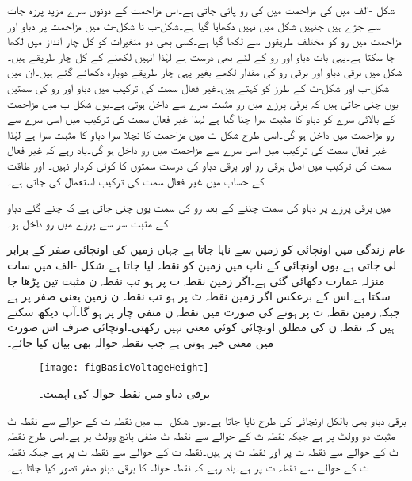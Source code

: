 شکل -الف میں  کی مزاحمت میں  کی رو پائی جاتی ہے۔اس مزاحمت کے دونوں سرے مزید پرزہ جات سے جڑے ہیں جنہیں شکل میں نہیں دکھایا گیا ہے۔شکل-ب تا شکل-ٹ میں مزاحمت پر دباو اور مزاحمت میں رو کو مختلف طریقوں سے لکھا گیا ہے۔کسی بھی دو متغیرات کو کل چار انداز میں لکھا جا سکتا ہے۔یہی بات دباو اور رو کے لئے بھی درست ہے لہٰذا انہیں لکھنے کے کل چار طریقے ہیں۔شکل  میں برقی دباو اور برقی رو کی مقدار لکھے بغیر یہی چار طریقے دوبارہ دکھائے گئے ہیں۔ان میں شکل-ب اور شکل-ٹ کے طرز کو  کہتے ہیں۔غیر فعال سمت کی ترکیب میں دباو  اور رو  کی سمتیں یوں چنی جاتی ہیں کہ برقی پرزے میں رو مثبت سرے سے داخل ہوتی ہے۔یوں شکل-ب میں مزاحمت کے بالائی سرے کو دباو کا مثبت سرا چنا گیا ہے لہٰذا غیر فعال سمت کی ترکیب میں اسی سرے سے رو مزاحمت میں داخل ہو گی۔اسی طرح شکل-ٹ میں مزاحمت کا نچلا سرا دباو کا مثبت سرا ہے لہٰذا غیر فعال سمت کی ترکیب میں اسی سرے سے مزاحمت میں رو داخل ہو گی۔یاد رہے کہ غیر فعال سمت کی ترکیب میں اصل برقی رو اور برقی دباو کی درست سمتوں کا کوئی کردار نہیں۔ اور طاقت کے حساب میں غیر فعال سمت کی ترکیب استعمال کی جاتی ہے۔

 میں برقی پرزے پر دباو کی سمت چننے کے بعد رو کی سمت یوں چنی جاتی ہے کہ چنے گئے دباو کے مثبت سر سے پرزے میں  رو داخل ہو۔

عام زندگی میں اونچائی کو زمین سے ناپا جاتا ہے جہاں زمین کی اونچائی صفر کے برابر لی جاتی ہے۔یوں اونچائی کے ناپ میں زمین کو نقطہ  لیا جاتا ہے۔شکل -الف میں سات منزلہ عمارت دکھائی گئی ہے۔اگر زمین نقطہ ت پر ہو تب نقطہ ن مثبت تین پڑھا جا سکتا ہے۔اس کے برعکس اگر زمین نقطہ ٹ پر ہو تب نقطہ ن زمین یعنی صفر پر ہے جبکہ زمین نقطہ ث پر ہونے کی صورت میں نقطہ ن منفی چار پر ہو گا۔آپ دیکھ سکتے ہیں کہ نقطہ ن کی مطلق اونچائی کوئی معنی نہیں رکھتی۔اونچائی صرف اس صورت میں معنی خیز ہوتی ہے جب نقطہ حوالہ بھی بیان کیا جائے۔
\begin{figure}
\centering
\texttt{[image: figBasicVoltageHeight]}
\caption{برقی دباو میں نقطہ حوالہ کی اہمیت۔}
\label{شکل_بنیادی_دباو_اور_اونچائی}
\end{figure}

برقی دباو بھی بالکل اونچائی کی طرح ناپا جاتا ہے۔یوں شکل -ب میں نقطہ ت کے حوالے سے نقطہ ٹ مثبت دو وولٹ  پر ہے جبکہ نقطہ ث کے حوالے سے نقطہ ٹ منفی پانچ وولٹ  پر ہے۔اسی طرح نقطہ ٹ کے حوالے سے نقطہ ت  پر اور نقطہ ث  پر ہیں۔نقطہ ت کے حوالے سے نقطہ ث  پر ہے جبکہ نقطہ ث کے حوالے سے نقطہ ت  پر ہے۔یاد رہے کہ نقطہ حوالہ کا برقی دباو صفر تصور کیا جاتا ہے۔

